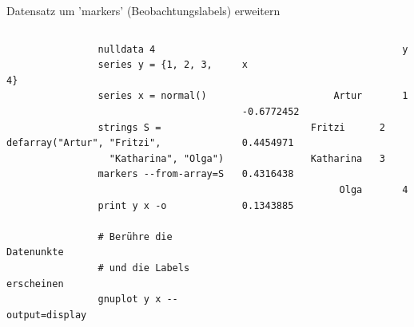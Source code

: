 \documentclass{beamer}[11pt]
\begin{document}
\begin{frame}[fragile]{Datensatz um 'markers' (Beobachtungslabels) erweitern}
	\begin{columns}[T] %
		\scriptsize
		\begin{column}{.55\textwidth}
			\begin{verbatim}
				nulldata 4
				series y = {1, 2, 3, 4}
				series x = normal()

				strings S = defarray("Artur", "Fritzi",
				  "Katharina", "Olga")
				markers --from-array=S

				print y x -o

				# Berühre die Datenunkte
				# und die Labels erscheinen
				gnuplot y x --output=display
			\end{verbatim}
		\end{column}

		\begin{column}{.45\textwidth}
			\scriptsize
			\begin{verbatim}
				            y            x

				Artur       1   -0.6772452
			Fritzi      2    0.4454971
			Katharina   3    0.4316438
				 Olga       4    0.1343885
			\end{verbatim}
	  \end{column}
	\end{columns}
\end{frame}
\end{document}

